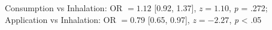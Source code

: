 Consumption vs Inhalation: OR $=1.12$ [0.92, 1.37], $z=1.10$, \textit{p} = .272; Application vs Inhalation: OR $=0.79$ [0.65, 0.97], $z=-2.27$, \textit{p} < .05%
